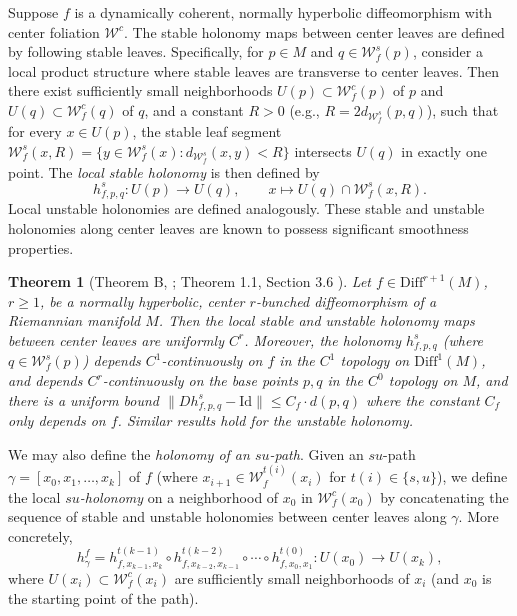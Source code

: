 \documentclass[11pt]{amsart}
\numberwithin{equation}{section}
\theoremstyle{plain}
\newtheorem{thm}{Theorem}[section]
\begin{document}
Suppose $f$ is a dynamically coherent, normally hyperbolic diffeomorphism with center foliation $\mathcal{W}^c$. The stable holonomy maps between center leaves are defined by following stable leaves. Specifically, for $p \in M$ and $q \in \mathcal{W}^s_f(p)$, consider a local product structure where stable leaves are transverse to center leaves. Then there exist sufficiently small neighborhoods $U(p) \subset \mathcal{W}^c_f(p)$ of $p$ and $U(q) \subset \mathcal{W}^c_f(q)$ of $q$, and a constant $R > 0$ (e.g., $R = 2 d_{\mathcal{W}^s_f}(p,q)$), such that for every $x \in U(p)$, the stable leaf segment $\mathcal{W}^s_f(x, R) = \{ y \in \mathcal{W}^s_f(x) : d_{\mathcal{W}^s_f}(x,y) < R \}$ intersects $U(q)$ in exactly one point. The \emph{local stable holonomy} is then defined by
$$
h^s_{f,p,q}: U(p) \to U(q), \qquad x \mapsto U(q) \cap \mathcal{W}^s_f(x,R).
$$
Local unstable holonomies are defined analogously. These stable and unstable holonomies along center leaves are known to possess significant smoothness properties.

\begin{thm}[Theorem B, \cite{PSW}; Theorem 1.1, Section 3.6 \cite{Saghin}]\label{c1hol}
Let $f \in \mathrm{Diff}^{r+1}(M)$, $r \ge 1$, be a normally hyperbolic, center $r$-bunched diffeomorphism of a Riemannian manifold $M$. Then the local stable and unstable holonomy maps between center leaves are uniformly $C^r$.  Moreover, the holonomy $h^s_{f,p,q}$ (where $q \in \mathcal{W}^s_f(p)$) depends $C^1$-continuously on $f$ in the $C^1$ topology on $\mathrm{Diff}^1(M)$, and depends $C^r$-continuously on the base points $p,q$ in the $C^0$ topology on $M$, and there is a uniform bound $\|Dh^s_{f,p,q}-\mathrm{Id}\|\le C_f\cdot d(p,q)$ where the constant $C_f$ only depends on $f$. Similar results hold for the unstable holonomy.
\end{thm}


We may also define the \emph{holonomy of an $su$-path}. Given an $su$-path $\gamma = [x_0, x_1, \dots, x_k]$ of $f$ (where $x_{i+1} \in \mathcal{W}^{t(i)}_f(x_i)$ for $t(i) \in \{s, u\}$), we define the local \emph{$su$-holonomy} on a neighborhood of $x_0$ in $\mathcal{W}^c_f(x_0)$ by concatenating the sequence of stable and unstable holonomies between center leaves along $\gamma$. More concretely,
$$
h_\gamma^f = h^{t(k-1)}_{f,x_{k-1},x_k} \circ h^{t(k-2)}_{f,x_{k-2},x_{k-1}} \circ \cdots \circ h^{t(0)}_{f,x_0,x_1}: U(x_0) \to U(x_k),
$$
where $U(x_i) \subset \mathcal{W}^c_f(x_i)$ are sufficiently small neighborhoods of $x_i$ (and $x_0$ is the starting point of the path).
\end{document}
